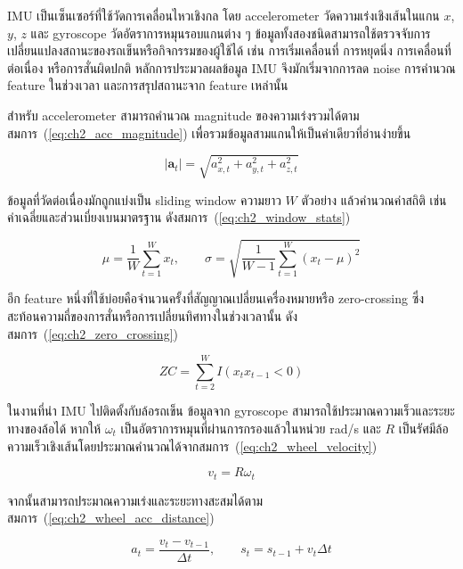 IMU เป็นเซ็นเซอร์ที่ใช้วัดการเคลื่อนไหวเชิงกล โดย accelerometer วัดความเร่งเชิงเส้นในแกน $x$, $y$, $z$ และ gyroscope วัดอัตราการหมุนรอบแกนต่าง ๆ ข้อมูลทั้งสองชนิดสามารถใช้ตรวจจับการเปลี่ยนแปลงสถานะของรถเข็นหรือกิจกรรมของผู้ใช้ได้ เช่น การเริ่มเคลื่อนที่ การหยุดนิ่ง การเคลื่อนที่ต่อเนื่อง หรือการสั่นผิดปกติ หลักการประมวลผลข้อมูล IMU จึงมักเริ่มจากการลด noise การคำนวณ feature ในช่วงเวลา และการสรุปสถานะจาก feature เหล่านั้น \cite{Lara2013WearableHAR}

สำหรับ accelerometer สามารถคำนวณ magnitude ของความเร่งรวมได้ตามสมการ~(\ref{eq:ch2_acc_magnitude}) เพื่อรวมข้อมูลสามแกนให้เป็นค่าเดียวที่อ่านง่ายขึ้น

\begin{equation}
    |\mathbf{a}_t| = \sqrt{a_{x,t}^{2}+a_{y,t}^{2}+a_{z,t}^{2}}
    \label{eq:ch2_acc_magnitude}
\end{equation}

ข้อมูลที่วัดต่อเนื่องมักถูกแบ่งเป็น sliding window ความยาว $W$ ตัวอย่าง แล้วคำนวณค่าสถิติ เช่น ค่าเฉลี่ยและส่วนเบี่ยงเบนมาตรฐาน ดังสมการ~(\ref{eq:ch2_window_stats})

\begin{equation}
    \mu = \frac{1}{W}\sum_{t=1}^{W}x_t, \qquad
    \sigma = \sqrt{\frac{1}{W-1}\sum_{t=1}^{W}(x_t-\mu)^2}
    \label{eq:ch2_window_stats}
\end{equation}

อีก feature หนึ่งที่ใช้บ่อยคือจำนวนครั้งที่สัญญาณเปลี่ยนเครื่องหมายหรือ zero-crossing ซึ่งสะท้อนความถี่ของการสั่นหรือการเปลี่ยนทิศทางในช่วงเวลานั้น ดังสมการ~(\ref{eq:ch2_zero_crossing})

\begin{equation}
    ZC = \sum_{t=2}^{W} I(x_t x_{t-1} < 0)
    \label{eq:ch2_zero_crossing}
\end{equation}

ในงานที่นำ IMU ไปติดตั้งกับล้อรถเข็น ข้อมูลจาก gyroscope สามารถใช้ประมาณความเร็วและระยะทางของล้อได้ หากให้ $\omega_t$ เป็นอัตราการหมุนที่ผ่านการกรองแล้วในหน่วย rad/s และ $R$ เป็นรัศมีล้อ ความเร็วเชิงเส้นโดยประมาณคำนวณได้จากสมการ~(\ref{eq:ch2_wheel_velocity})

\begin{equation}
    v_t = R\omega_t
    \label{eq:ch2_wheel_velocity}
\end{equation}

จากนั้นสามารถประมาณความเร่งและระยะทางสะสมได้ตามสมการ~(\ref{eq:ch2_wheel_acc_distance})

\begin{equation}
    a_t = \frac{v_t-v_{t-1}}{\Delta t}, \qquad
    s_t = s_{t-1} + v_t \Delta t
    \label{eq:ch2_wheel_acc_distance}
\end{equation}

